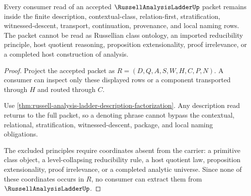 \begin{theorem}
\label{thm:russell-analysis-ladder-non-escape-boundary}
Every consumer read of an accepted $\RussellAnalysisLadderUp$ packet remains inside the finite description, contextual-class, relation-first, stratification, witnessed-descent, transport, continuation, provenance, and local naming rows. The packet cannot be read as Russellian class ontology, an imported reducibility principle, host quotient reasoning, proposition extensionality, proof irrelevance, or a completed host construction of analysis.
\end{theorem}
\begin{proof}
Project the accepted packet as $R=(D,Q,A,S,W,H,C,P,N)$. A consumer can inspect only these displayed rows or a component transported through $H$ and routed through $C$.

Use \autoref{thm:russell-analysis-ladder-description-factorization}. Any description read returns to the full packet, so a denoting phrase cannot bypass the contextual, relational, stratification, witnessed-descent, package, and local naming obligations.

The excluded principles require coordinates absent from the carrier: a primitive class object, a level-collapsing reducibility rule, a host quotient law, proposition extensionality, proof irrelevance, or a completed analytic universe. Since none of these coordinates occurs in $R$, no consumer can extract them from $\RussellAnalysisLadderUp$.
\end{proof}

